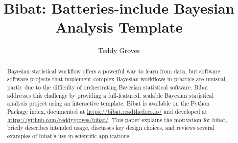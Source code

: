 \documentclass[sigconf, review]{acmart}
\begin{document}
\title{Bibat: Batteries-include Bayesian Analysis Template}



  \author{Teddy Groves}


\begin{abstract}
Bayesian statistical workflow offers a powerful way to learn from data,
but software software projects that implement complex Bayesian workflows
in practice are unusual, partly due to the difficulty of orchestrating
Bayesian statistical software. Bibat addresses this challenge by
providing a full-featured, scalable Bayesian statistical analysis
project using an interactive template. Bibat is available on the Python
Package index, documented at \url{https://bibat.readthedocs.io/} and
developed at \url{https://github.com/teddygroves/bibat/}. This paper
explains the motivation for bibat, briefly describes intended usage,
discusses key design choices, and reviews several examples of bibat's
use in scientific applications.
\end{abstract}


\end{document}
